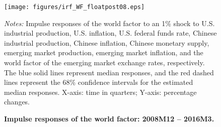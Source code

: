 \documentclass[12pt]{article}
\numberwithin{equation}{section}
\begin{document}
%


\newpage

\begin{figure}
\centering
\caption{\textbf{Impulse responses of the world factor: 2008M12 -- 2016M3.}}
\texttt{[image: figures/irf\_WF\_floatpost08.eps]}

\label{fig:IRF_WF_after1}
\begin{minipage}{1\linewidth}
		\footnotesize
	\emph{Notes:} Impulse responses of the world factor to an  1\%  shock to U.S. industrial production, U.S. inflation, U.S. federal funds rate, Chinese industrial production, Chinese inflation, Chinese monetary supply, emerging market production, emerging market inflation, and the world factor of the emerging market exchange rates, respectively. The blue solid lines represent median responses, and the red dashed lines represent the 68\% confidence intervals for the estimated median responses. X-axis:  time in quarters; Y-axis:  percentage changes.
\end{minipage}
\end{figure}
\clearpage
\newpage
\end{document}
